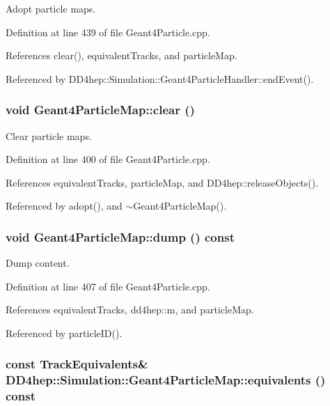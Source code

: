 Adopt particle maps. 

Definition at line 439 of file Geant4Particle.cpp.

References clear(), equivalentTracks, and particleMap.

Referenced by DD4hep::Simulation::Geant4ParticleHandler::endEvent().\hypertarget{class_d_d4hep_1_1_simulation_1_1_geant4_particle_map_a8a8ea52d779e40d4f41b369a8bc659fe}{
\subsubsection[{clear}]{\setlength{\rightskip}{0pt plus 5cm}void Geant4ParticleMap::clear ()}}
\label{class_d_d4hep_1_1_simulation_1_1_geant4_particle_map_a8a8ea52d779e40d4f41b369a8bc659fe}


Clear particle maps. 

Definition at line 400 of file Geant4Particle.cpp.

References equivalentTracks, particleMap, and DD4hep::releaseObjects().

Referenced by adopt(), and $\sim$Geant4ParticleMap().\hypertarget{class_d_d4hep_1_1_simulation_1_1_geant4_particle_map_afde244bfd828c1b09e515c76626a925e}{
\subsubsection[{dump}]{\setlength{\rightskip}{0pt plus 5cm}void Geant4ParticleMap::dump () const}}
\label{class_d_d4hep_1_1_simulation_1_1_geant4_particle_map_afde244bfd828c1b09e515c76626a925e}


Dump content. 

Definition at line 407 of file Geant4Particle.cpp.

References equivalentTracks, dd4hep::m, and particleMap.

Referenced by particleID().\hypertarget{class_d_d4hep_1_1_simulation_1_1_geant4_particle_map_a82008879ab783a6e8d3cc683ba7fec5e}{
\subsubsection[{equivalents}]{\setlength{\rightskip}{0pt plus 5cm}const {\bf TrackEquivalents}\& DD4hep::Simulation::Geant4ParticleMap::equivalents () const}}
\label{class_d_d4hep_1_1_simulation_1_1_geant4_particle_map_a82008879ab783a6e8d3cc683ba7fec5e}


